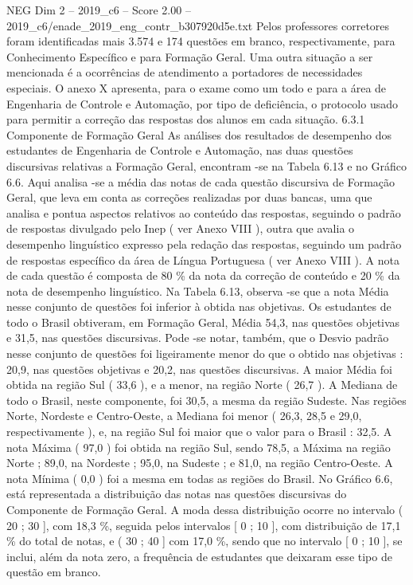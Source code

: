 \begin{textsample}{NEG Dim 2 – 2019\_c6 – Score 2.00 – 2019\_c6/enade\_2019\_eng\_contr\_b307920d5e.txt}
Pelos professores corretores foram identificadas mais 3.574 e 174 questões em branco, respectivamente, para Conhecimento Específico e para Formação Geral.
Uma outra situação a ser mencionada é a ocorrências de atendimento a portadores de necessidades especiais.
O anexo X apresenta, para o exame como um todo e para a área de Engenharia de Controle e Automação, por tipo de deficiência, o protocolo usado para permitir a correção das respostas dos alunos em cada situação. 6.3.1 Componente de Formação Geral As análises dos resultados de desempenho dos estudantes de Engenharia de Controle e Automação, nas duas questões discursivas relativas a Formação Geral, encontram -se na Tabela 6.13 e no Gráfico 6.6.
Aqui analisa -se a média das notas de cada questão discursiva de Formação Geral, que leva em conta as correções realizadas por duas bancas, uma que analisa e pontua aspectos relativos ao conteúdo das respostas, seguindo o padrão de respostas divulgado pelo Inep ( ver Anexo VIII ), outra que avalia o desempenho linguístico expresso pela redação das respostas, seguindo um padrão de respostas específico da área de Língua Portuguesa ( ver Anexo VIII ).
A nota de cada questão é composta de 80 \% da nota da correção de conteúdo e 20 \% da nota de desempenho linguístico.
Na Tabela 6.13, observa -se que a nota Média nesse conjunto de questões foi inferior à obtida nas objetivas.
Os estudantes de todo o Brasil obtiveram, em Formação Geral, Média 54,3, nas questões objetivas e 31,5, nas questões discursivas.
Pode -se notar, também, que o Desvio padrão nesse conjunto de questões foi ligeiramente menor do que o obtido nas objetivas : 20,9, nas questões objetivas e 20,2, nas questões discursivas.
A maior Média foi obtida na região Sul ( 33,6 ), e a menor, na região Norte ( 26,7 ).
A Mediana de todo o Brasil, neste componente, foi 30,5, a mesma da região Sudeste.
Nas regiões Norte, Nordeste e Centro-Oeste, a Mediana foi menor ( 26,3, 28,5 e 29,0, respectivamente ), e, na região Sul foi maior que o valor para o Brasil : 32,5.
A nota Máxima ( 97,0 ) foi obtida na região Sul, sendo 78,5, a Máxima na região Norte ; 89,0, na Nordeste ; 95,0, na Sudeste ; e 81,0, na região Centro-Oeste.
A nota Mínima ( 0,0 ) foi a mesma em todas as regiões do Brasil.
No Gráfico 6.6, está representada a distribuição das notas nas questões discursivas do Componente de Formação Geral.
A moda dessa distribuição ocorre no intervalo ( 20 ; 30 ], com 18,3 \%, seguida pelos intervalos [ 0 ; 10 ], com distribuição de 17,1 \% do total de notas, e ( 30 ; 40 ] com 17,0 \%, sendo que no intervalo [ 0 ; 10 ], se inclui, além da nota zero, a frequência de estudantes que deixaram esse tipo de questão em branco.

\end{textsample}
